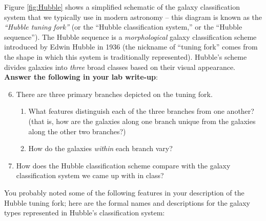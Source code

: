 \documentclass[11pt]{article}
\begin{document}
\noindent
Figure \ref{fig:Hubble} shows a simplified schematic of the galaxy classification system that we typically use in modern astronomy -- this diagram is known as the \textit{``Hubble tuning fork''} (or the ``Hubble classification system,'' or the ``Hubble sequence''). The Hubble sequence is a \emph{morphological} galaxy classification scheme introduced by Edwin Hubble in 1936 (the nickname of ``tuning fork'' comes from the shape in which this system is traditionally represented). Hubble's scheme divides galaxies into \emph{three} broad classes based on their visual appearance. \textbf{Answer the following in your lab write-up}:
\medskip
\begin{enumerate}
\setcounter{enumi}{5}
    \item There are three primary branches depicted on the tuning fork. 
    \begin{enumerate}
        \item What features distinguish each of the three branches from one another? (that is, how are the galaxies along one branch unique from the galaxies along the other two branches?)
        
        \item How do the galaxies \emph{within} each branch vary?
    \end{enumerate}
    
    \item How does the Hubble classification scheme compare with the galaxy classification system we came up with in class?
\end{enumerate}
\medskip

\noindent
You probably noted some of the following features in your description of the Hubble tuning fork; here are the formal names and descriptions for the galaxy types represented in Hubble's classification system:
\end{document}
